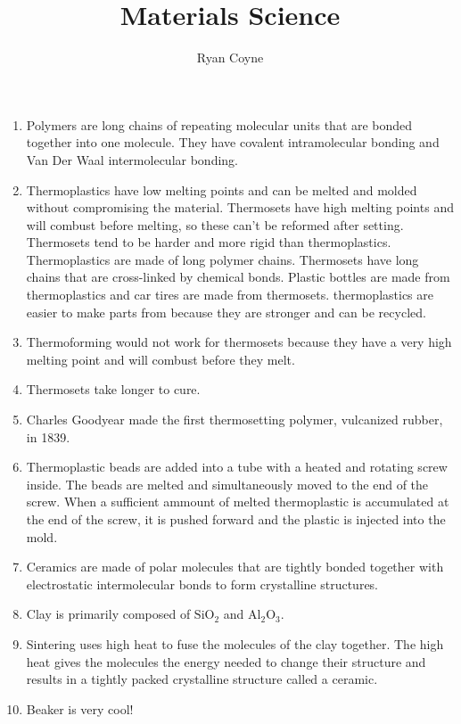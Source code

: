 \documentclass[12pt]{article}
\begin{document}
    \title{Materials Science}
    \author{Ryan Coyne}
    \maketitle
    \begin{enumerate}
        \item Polymers are long chains of repeating molecular units that are bonded together into one molecule. They have covalent intramolecular bonding and Van Der Waal intermolecular bonding.
        \item Thermoplastics have low melting points and can be melted and molded without compromising the material. Thermosets have high melting points and will combust before melting, so these can't be reformed after setting. Thermosets tend to be harder and more rigid than thermoplastics. Thermoplastics are made of long polymer chains. Thermosets have long chains that are cross-linked by chemical bonds. Plastic bottles are made from thermoplastics and car tires are made from thermosets. thermoplastics are easier to make parts from because they are stronger and  can be recycled.
        \item Thermoforming would not work for thermosets because they have a very high melting point and will combust before they melt.
        \item Thermosets take longer to cure.
        \item Charles Goodyear made the first thermosetting polymer, vulcanized rubber, in 1839.
        \item Thermoplastic beads are added into a tube with a heated and rotating screw inside. The beads are melted and simultaneously moved to the end of the screw. When a sufficient ammount of melted thermoplastic is accumulated at the end of the screw, it is pushed forward and the plastic is injected into the mold.
        \item Ceramics are made of polar molecules that are tightly bonded together with electrostatic intermolecular bonds to form crystalline structures.
        \item Clay is primarily composed of $\mathrm{SiO_2}$ and $\mathrm{Al_2O_3}$.
        \item Sintering uses high heat to fuse the molecules of the clay together. The high heat gives the molecules the energy needed to change their structure and results in a tightly packed crystalline structure called a ceramic.
        \item Beaker is very cool!
    \end{enumerate}
\end{document}
